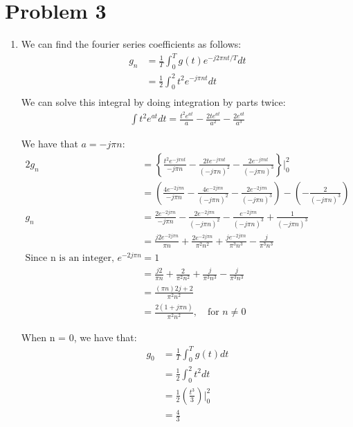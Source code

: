 \documentclass{article}
\begin{document}
\section{Problem 3}
\begin{enumerate}[label=3.\arabic*]
    \item We can find the fourier series coefficients as follows:
    \begin{align*}
        g_n &= \frac{1}{T} \int_{0}^{T} g(t) e^{-j2\pi n t/T} dt \\
        &= \frac{1}{2} \int_{0}^{2} t^2e^{-j\pi n t} dt \\
    \end{align*}
    We can solve this integral by doing integration by parts twice:
    \begin{align*}
        \int t^2 e^{at} dt = \frac{t^2 e^{at}}{a} - \frac{2t e^{at}}{a^2} - \frac{2 e^{at}}{a^3}
    \end{align*}

    We have that $a = -j\pi n$:
    \begin{align*}
        2g_n &= \left\{\frac{t^2 e^{-j\pi n t}}{-j\pi n} - \frac{2t e^{-j\pi n t}}{(-j\pi n)^2} - \frac{2 e^{-j\pi n t}}{(-j\pi n)^3}\right\} \Bigg|_{0}^{2} \\
        &= \left(\frac{4 e^{-2j\pi n}}{-j \pi n} - \frac{4 e^{-2j\pi n}}{(-j\pi n)^2} - \frac{2 e^{-2j\pi n}}{(-j\pi n)^3}\right) - \left(-\frac{2}{(-j\pi n )^3}\right) \\
        g_n &= \frac{2e^{-2j\pi n}}{-j \pi n} - \frac{2e^{-2j\pi n}}{(-j\pi n)^2} - \frac{e^{-2j\pi n}}{(-j\pi n)^3} + \frac{1}{(-j\pi n)^3} \\
        &= \frac{j2e^{-2j\pi n}}{\pi n} + \frac{2e^{-2j\pi n}}{\pi^2 n^2} + \frac{je^{-2j\pi n}}{\pi^3 n^3} - \frac{j}{\pi^3 n^3} \\
        \text{Since n is an integer, } e^{-2j\pi n} &= 1 \\
        &= \frac{j2}{\pi n} + \frac{2}{\pi^2 n^2} + \frac{j}{\pi^3 n^3} - \frac{j}{\pi^3 n^3} \\
        &= \frac{(\pi n)2j + 2}{\pi^2 n^2} \\
        &= \frac{2(1+j\pi n)}{\pi^2 n^2}, \quad \text{for } n \neq 0
    \end{align*}

    When n = 0, we have that:
    \begin{align*}
        g_0 &= \frac{1}{T} \int_{0}^{T} g(t) dt \\
        &= \frac{1}{2} \int_{0}^{2} t^2 dt \\
        &= \frac{1}{2} \left(\frac{t^3}{3}\right) \Bigg|_{0}^{2} \\
        &= \frac{4}{3}
    \end{align*}



\end{enumerate}
\end{document}
